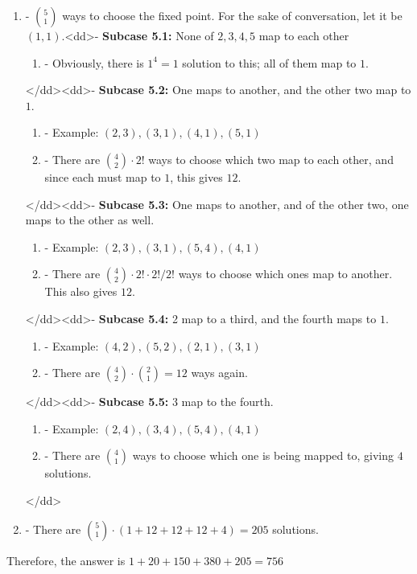 \begin{enumerate}
 
            \begin{enumerate}[label=(\roman*)]
                \item - $\binom 51$ ways to choose the fixed point.  For the sake of conversation, let it be $(1, 1)$.<dd>- \textbf{Subcase 5.1:} None of $2, 3, 4, 5$ map to each other
            \begin{enumerate}[label=(\roman*)]
                \item - Obviously, there is $1^4 = 1$ solution to this; all of them map to $1$.
            \end{enumerate}
            </dd><dd>- \textbf{Subcase 5.2:} One maps to another, and the other two map to $1$.
            \begin{enumerate}[label=(\roman*)]
                \item - Example: $(2, 3), (3, 1), (4, 1), (5, 1)$\item - There are $\binom 42 \cdot 2!$ ways to choose which two map to each other, and since each must map to $1$, this gives $12$.
            \end{enumerate}
            </dd><dd>- \textbf{Subcase 5.3:} One maps to another, and of the other two, one maps to the other as well.
            \begin{enumerate}[label=(\roman*)]
                \item - Example: $(2, 3), (3, 1), (5, 4), (4, 1)$\item - There are $\binom 42 \cdot 2! \cdot 2! / 2!$ ways to choose which ones map to another.  This also gives $12$.
            \end{enumerate}
            </dd><dd>- \textbf{Subcase 5.4:} 2 map to a third, and the fourth maps to $1$.
            \begin{enumerate}[label=(\roman*)]
                \item - Example: $(4, 2), (5, 2), (2, 1), (3, 1)$\item - There are $\binom 42 \cdot \binom 21 = 12$ ways again.
            \end{enumerate}
            </dd><dd>- \textbf{Subcase 5.5:} 3 map to the fourth.
            \begin{enumerate}[label=(\roman*)]
                \item - Example: $(2, 4), (3, 4), (5, 4), (4, 1)$\item - There are $\binom 41$ ways to choose which one is being mapped to, giving $4$ solutions.
            \end{enumerate}
            </dd>\item - There are $\binom 51 \cdot (1+12+12+12+4) = 205$ solutions.
            \end{enumerate}
            Therefore, the answer is $1+20+150+380+205 = \boxed{756}$





\end{enumerate}
